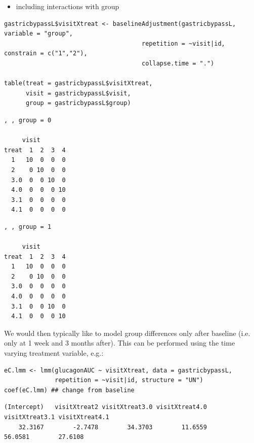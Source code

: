 \documentclass[12pt]{article}
\begin{document}
\begin{itemize}
\item including interactions with group
\end{itemize}
\lstset{language=r,label= ,caption= ,captionpos=b,numbers=none}
\begin{lstlisting}
gastricbypassL$visitXtreat <- baselineAdjustment(gastricbypassL, variable = "group",
                                      repetition = ~visit|id, constrain = c("1","2"),
                                      collapse.time = ".")

table(treat = gastricbypassL$visitXtreat,
      visit = gastricbypassL$visit,
      group = gastricbypassL$group)
\end{lstlisting}

\begin{minipage}{0.45\linewidth}
\begin{verbatim}
, , group = 0

     visit
treat  1  2  3  4
  1   10  0  0  0
  2    0 10  0  0
  3.0  0  0 10  0
  4.0  0  0  0 10
  3.1  0  0  0  0
  4.1  0  0  0  0
\end{verbatim}
\end{minipage}
\begin{minipage}{0.05\linewidth}
\hphantom{x}
\end{minipage}
\begin{minipage}{0.45\linewidth}
\begin{verbatim}
, , group = 1

     visit
treat  1  2  3  4
  1   10  0  0  0
  2    0 10  0  0
  3.0  0  0  0  0
  4.0  0  0  0  0
  3.1  0  0 10  0
  4.1  0  0  0 10
\end{verbatim}

\end{minipage}

We would then typically like to model group differences only after
baseline (i.e. only at 1 week and 3 months after). This can be
performed using the time varying treatment variable, e.g.:
\lstset{language=r,label= ,caption= ,captionpos=b,numbers=none}
\begin{lstlisting}
eC.lmm <- lmm(glucagonAUC ~ visitXtreat, data = gastricbypassL,
              repetition = ~visit|id, structure = "UN")
coef(eC.lmm) ## change from baseline
\end{lstlisting}

\begin{verbatim}
(Intercept)   visitXtreat2 visitXtreat3.0 visitXtreat4.0 visitXtreat3.1 visitXtreat4.1 
    32.3167        -2.7478        34.3703        11.6559        56.0581        27.6108
\end{verbatim}
\end{document}
